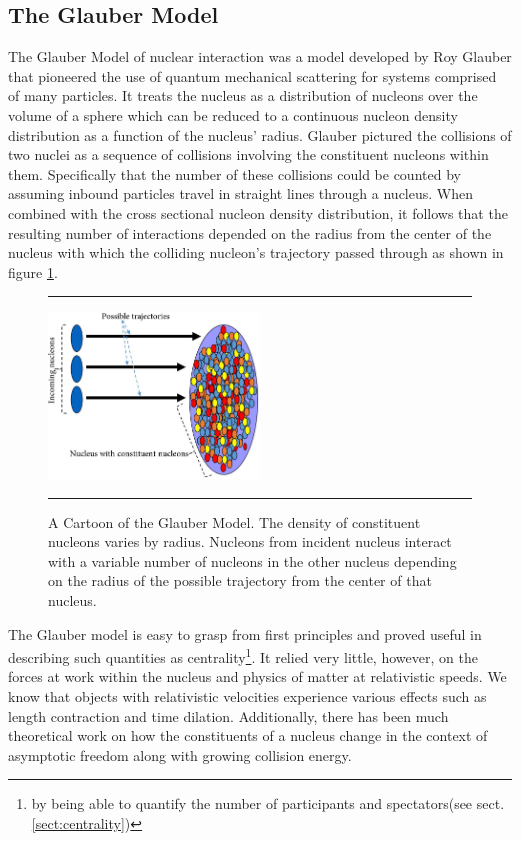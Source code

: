\subsection{The Glauber Model}
The Glauber Model of nuclear interaction was a model developed by Roy Glauber that pioneered the use of quantum mechanical scattering for systems comprised of many particles. It treats the nucleus as a distribution of nucleons over the volume of a sphere which can be reduced to a continuous nucleon density distribution as a function of the nucleus' radius\citep{Miller:2007ri}. Glauber pictured the collisions of two nuclei as a sequence of collisions involving the constituent nucleons within them. Specifically that the number of these collisions could be counted by assuming inbound particles travel in straight lines through a nucleus. When combined with the cross sectional nucleon density distribution, it follows that the resulting number of interactions depended on the radius from the center of the nucleus with which the colliding nucleon's trajectory passed through as shown in figure \ref{fig:glaubermodel}.
\begin{figure}[b!]
  \centering
    \rule{35em}{0.5pt}
    \includegraphics[width=0.5\textwidth]{Figures/glauberpic.jpg}

  \caption[A Cartoon of the Glauber Model]{A Cartoon of the Glauber Model. The density of constituent nucleons varies by radius. Nucleons from incident nucleus interact with a variable number of nucleons in the other nucleus depending on the radius of the possible trajectory from the center of that nucleus. \citep{Nagle:2006}}
  \label{fig:glaubermodel}
    \rule{35em}{0.5pt}
\end{figure}

The Glauber model is easy to grasp from first principles and proved useful in describing such quantities as centrality\footnote{by being able to quantify the number of participants and spectators(see sect. \ref{sect:centrality})}. It relied very little, however, on the forces at work within the nucleus and physics of matter at relativistic speeds. We know that objects with relativistic velocities experience various effects such as length contraction and time dilation. Additionally, there has been much theoretical work on how the constituents of a nucleus change in the context of asymptotic freedom along with growing collision energy\citep{PhysRevD.10.1649}.

